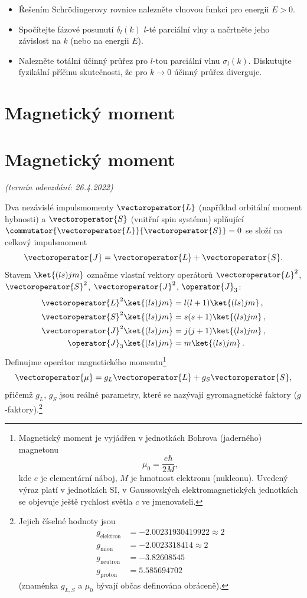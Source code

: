 \documentclass[a4paper,11pt,twoside]{book}
\def\np{\newpage}
\newcommand{\exercise}[2][]{\ifthenelse{\isempty{#1}}
	{\np\section{#2}}
	{\np\section{#2}\small{\it{(termín odevzdání: {#1})}\newline}}
}
\begin{document}
    \begin{itemize}
        \item 
            Řešením Schrödingerovy rovnice nalezněte vlnovou funkci pro energii $E>0$.
            
        \item
            Spočítejte fázové posunutí $\delta_{l}(k)$ $l$-té parciální vlny 
            a načrtněte jeho závislost na $k$ (nebo na energii $E$).
            
        \item
            Nalezněte totální účinný průřez pro $l$-tou parciální vlnu $\sigma_{l}(k)$.
            Diskutujte fyzikální příčinu skutečnosti, že pro $k\rightarrow0$ účinný průřez diverguje.
    \end{itemize}    

    \exercise[26.4.2022]{Magnetický moment}
	Dva nezávislé impulsmomenty $\vectoroperator{L}$ (například orbitální moment hybnosti) a $\vectoroperator{S}$ (vnitřní spin systému) splňující $\commutator{\vectoroperator{L}}{\vectoroperator{S}}=0$ se složí na celkový impulsmoment
	\begin{equation*}
		\vectoroperator{J}=\vectoroperator{L}+\vectoroperator{S}.
	\end{equation*}
	Stavem $\ket{(ls)jm}$ označme vlastní vektory operátorů $\vectoroperator{L}^{2}$, $\vectoroperator{S}^{2}$, $\vectoroperator{J}^{2}$, $\operator{J}_{3}$:
	\begin{align*}
		\vectoroperator{L}^{2}\ket{(ls)jm}&=l(l+1)\ket{(ls)jm}\,,\\
		\vectoroperator{S}^{2}\ket{(ls)jm}&=s(s+1)\ket{(ls)jm}\,,\\
		\vectoroperator{J}^{2}\ket{(ls)jm}&=j(j+1)\ket{(ls)jm}\,,\\
		\operator{J}_{3}\ket{(ls)jm}&=m\ket{(ls)jm}\,.
		\label{eq:lsev}
	\end{align*}
	Definujme operátor magnetického momentu\footnote{
		Magnetický moment je vyjádřen v jednotkách Bohrova (jaderného) magnetonu
		\begin{equation*}
			\mu_{0}=\frac{e\hbar}{2M},
		\end{equation*}
		kde $e$ je elementární náboj, $M$ je hmotnost elektronu (nukleonu).
		Uvedený výraz platí v jednotkách SI, v Gaussovských elektromagnetických jednotkách se objevuje ještě rychlost světla $c$ ve jmenovateli.
	}
	\begin{equation*}
		\vectoroperator{\mu}=g_{L}\vectoroperator{L}+g_{S}\vectoroperator{S},
	\end{equation*}
	přičemž $g_{L}$, $g_{S}$ jsou reálné parametry, které se nazývají gyromagnetické faktory ($g$-faktory).\footnote{
		Jejich číselné hodnoty jsou
		\begin{align*}
			g_{\mathrm{elektron}}&=-2.00231930419922\approx2 \\
			g_{\mathrm{mion}}&=-2.0023318414\approx2 \\
			g_{\mathrm{neutron}}&=-3.82608545\\
			g_{\mathrm{proton}}&=5.585694702
		\end{align*}
		(znaménka $g_{L,S}$ a $\mu_{0}$ bývají občas definována obráceně).
	}
\end{document}

